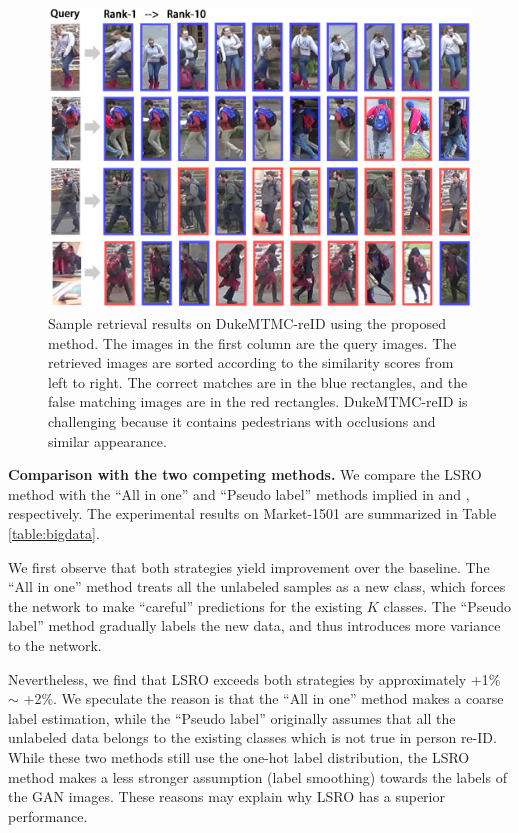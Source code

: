 \documentclass[10pt,twocolumn,letterpaper]{article}
\begin{document}
\begin{figure}
\begin{center}
   \includegraphics[width=1\linewidth]{duke_rank.eps}
\end{center}
   \caption{Sample retrieval results on DukeMTMC-reID using the proposed method. The images in the first column are the query images. The retrieved images are sorted according to the similarity scores from left to right. The correct matches are in the blue rectangles, and the false matching images are in the red rectangles. DukeMTMC-reID is challenging because it contains pedestrians with occlusions and similar appearance.}
\label{fig:duke}
\end{figure} 

\textbf{Comparison with the two competing methods.}
We compare the LSRO method with the ``All in one'' and ``Pseudo label'' methods implied in \cite{odena2016semi,salimans2016improved} and \cite{lee2013pseudo}, respectively. The experimental results on Market-1501 are summarized in Table \ref{table:bigdata}. 

We first observe that both strategies yield improvement over the baseline. The ``All in one'' method treats all the unlabeled samples as a new class, which forces the network to make ``careful'' predictions for the existing $K$ classes. The ``Pseudo label'' method gradually labels the new data, and thus introduces more variance to the network. 

Nevertheless, we find that LSRO exceeds both strategies by approximately +1\% $\sim$ +2\%. We speculate the reason is that the ``All in one'' method makes a coarse label estimation, while the ``Pseudo label'' originally assumes that all the unlabeled data belongs to the existing classes \cite{lee2013pseudo} which is not true in person re-ID. While these two methods still use the one-hot label distribution, the LSRO method makes a less stronger assumption (label smoothing) towards the labels of the GAN images. These reasons may explain why LSRO has a superior performance.
\end{document}
